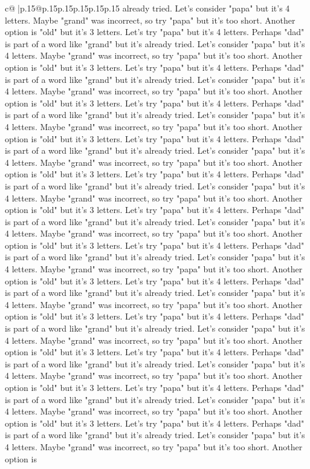 \documentclass{article}
\begin{document}
{\begin{supertabular}{c@{$\;$}|p{.15\linewidth}@{}p{.15\linewidth}p{.15\linewidth}p{.15\linewidth}p{.15\linewidth}p{.15\linewidth}}
{{{already tried. Let's consider "papa" but it's 4 letters. Maybe "grand" was incorrect, so try "papa" but it's too short. Another option is "old" but it's 3 letters. Let's try "papa" but it's 4 letters. Perhaps "dad" is part of a word like "grand" but it's already tried. Let's consider "papa" but it's 4 letters. Maybe "grand" was incorrect, so try "papa" but it's too short. Another option is "old" but it's 3 letters. Let's try "papa" but it's 4 letters. Perhaps "dad" is part of a word like "grand" but it's already tried. Let's consider "papa" but it's 4 letters. Maybe "grand" was incorrect, so try "papa" but it's too short. Another option is "old" but it's 3 letters. Let's try "papa" but it's 4 letters. Perhaps "dad" is part of a word like "grand" but it's already tried. Let's consider "papa" but it's 4 letters. Maybe "grand" was incorrect, so try "papa" but it's too short. Another option is "old" but it's 3 letters. Let's try "papa" but it's 4 letters. Perhaps "dad" is part of a word like "grand" but it's already tried. Let's consider "papa" but it's 4 letters. Maybe "grand" was incorrect, so try "papa" but it's too short. Another option is "old" but it's 3 letters. Let's try "papa" but it's 4 letters. Perhaps "dad" is part of a word like "grand" but it's already tried. Let's consider "papa" but it's 4 letters. Maybe "grand" was incorrect, so try "papa" but it's too short. Another option is "old" but it's 3 letters. Let's try "papa" but it's 4 letters. Perhaps "dad" is part of a word like "grand" but it's already tried. Let's consider "papa" but it's 4 letters. Maybe "grand" was incorrect, so try "papa" but it's too short. Another option is "old" but it's 3 letters. Let's try "papa" but it's 4 letters. Perhaps "dad" is part of a word like "grand" but it's already tried. Let's consider "papa" but it's 4 letters. Maybe "grand" was incorrect, so try "papa" but it's too short. Another option is "old" but it's 3 letters. Let's try "papa" but it's 4 letters. Perhaps "dad" is part of a word like "grand" but it's already tried. Let's consider "papa" but it's 4 letters. Maybe "grand" was incorrect, so try "papa" but it's too short. Another option is "old" but it's 3 letters. Let's try "papa" but it's 4 letters. Perhaps "dad" is part of a word like "grand" but it's already tried. Let's consider "papa" but it's 4 letters. Maybe "grand" was incorrect, so try "papa" but it's too short. Another option is "old" but it's 3 letters. Let's try "papa" but it's 4 letters. Perhaps "dad" is part of a word like "grand" but it's already tried. Let's consider "papa" but it's 4 letters. Maybe "grand" was incorrect, so try "papa" but it's too short. Another option is "old" but it's 3 letters. Let's try "papa" but it's 4 letters. Perhaps "dad" is part of a word like "grand" but it's already tried. Let's consider "papa" but it's 4 letters. Maybe "grand" was incorrect, so try "papa" but it's too short. Another option is "old" but it's 3 letters. Let's try "papa" but it's 4 letters. Perhaps "dad" is part of a word like "grand" but it's already tried. Let's consider "papa" but it's 4 letters. Maybe "grand" was incorrect, so try "papa" but it's too short. Another option is }}}
\end{supertabular}}
\end{document}
